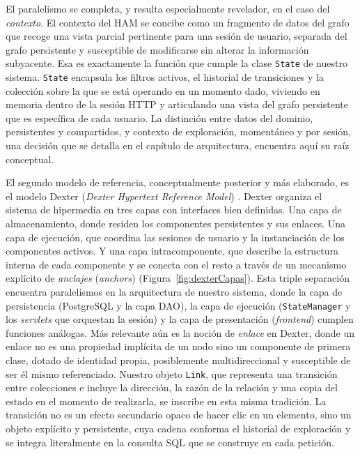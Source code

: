 El paralelismo se completa, y resulta especialmente revelador, en el caso del \textit{contexto}.
El contexto del HAM se concibe como un fragmento de datos del grafo que recoge una vista parcial
pertinente para una sesión de usuario, separada del grafo persistente y susceptible de modificarse sin
alterar la información subyacente. Esa es exactamente la función que cumple la clase \texttt{State} de
nuestro sistema. \texttt{State} encapsula los filtros activos, el historial de transiciones y la colección
sobre la que se está operando en un momento dado, viviendo en memoria dentro de la sesión HTTP y
articulando una vista del grafo persistente que es específica de cada usuario. La distinción entre datos
del dominio, persistentes y compartidos, y contexto de exploración, momentáneo y por sesión, una
decisión que se detalla en el capítulo de arquitectura, encuentra aquí su raíz conceptual.

El segundo modelo de referencia, conceptualmente posterior y más elaborado, es el modelo Dexter
(\textit{Dexter Hypertext Reference Model}) \citep{halasz1994dexter}. Dexter organiza el sistema de hipermedia en tres capas
con interfaces bien definidas. Una capa de almacenamiento, donde residen los componentes
persistentes y sus enlaces. Una capa de ejecución, que coordina las sesiones de usuario y la
instanciación de los componentes activos. Y una capa intracomponente, que describe la estructura
interna de cada componente y se conecta con el resto a través de un mecanismo explícito de
\textit{anclajes} (\textit{anchors}) (Figura~\ref{fig:dexterCapas}). Esta triple separación encuentra paralelismos en la arquitectura de
nuestro sistema, donde la capa de persistencia (PostgreSQL y la capa DAO), la capa de ejecución
(\texttt{StateManager} y los \textit{servlets} que orquestan la sesión) y la capa de presentación
(\textit{frontend}) cumplen funciones análogas. Más relevante aún es la noción de \textit{enlace} en
Dexter, donde un enlace no es una propiedad implícita de un nodo sino un componente de primera
clase, dotado de identidad propia, posiblemente multidireccional y susceptible de ser él mismo
referenciado. Nuestro objeto \texttt{Link}, que representa una transición entre colecciones e incluye la
dirección, la razón de la relación y una copia del estado en el momento de realizarla, se inscribe en
esta misma tradición. La transición no es un efecto secundario opaco de hacer clic en un elemento,
sino un objeto explícito y persistente, cuya cadena conforma el historial de exploración y se integra
literalmente en la consulta SQL que se construye en cada petición.

